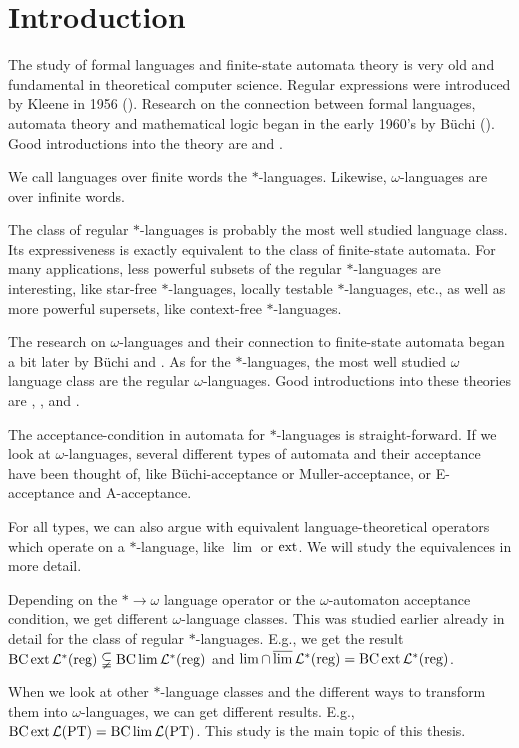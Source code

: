 
\section{Introduction}

The study of formal languages and finite-state automata theory is very old and fundamental in theoretical computer science. Regular expressions were introduced by Kleene in 1956 (\cite{Kleene56}). Research on the connection between formal languages, automata theory and mathematical logic began in the early 1960's by Büchi (\cite{Buchi60}). Good introductions into the theory are \cite{FinAutLogR109} and \cite{LangAutLogicR102}.

We call languages over finite words the $*$-languages. Likewise, $\omega$-languages are over infinite words.

The class of regular $*$-languages is probably the most well studied language class. Its expressiveness is exactly equivalent to the class of finite-state automata. For many applications, less powerful subsets of the regular $*$-languages are interesting, like star-free $*$-languages, locally testable $*$-languages, etc., as well as more powerful supersets, like context-free $*$-languages.

The research on $\omega$-languages and their connection to finite-state automata began a bit later by Büchi \cite{DecisionSOR111} and \cite{Muller63}. As for the $*$-languages, the most well studied $\omega$ language class are the regular $\omega$-languages. Good introductions into these theories are \cite{AutInfObjsR103}, \cite{InfCompR101}, \cite{OmLangR108} and \cite{InfWordsR110}.

The acceptance-condition in automata for $*$-languages is straight-forward. If we look at $\omega$-languages, several different types of automata and their acceptance have been thought of, like Büchi-acceptance or Muller-acceptance, or E-acceptance and A-acceptance.

For all types, we can also argue with equivalent language-theoretical operators which operate on a $*$-language, like $\lim$ or $\operatorname{ext}$. We will study the equivalences in more detail.

Depending on the $* \rightarrow \omega$ language operator or the $\omega$-automaton acceptance condition, we get different $\omega$-language classes. This was studied earlier already in detail for the class of regular $*$-languages. E.g., we get the result $\operatorname{BC} \operatorname{ext} \mathcal{L}^*(\text{reg}) \subsetneqq \operatorname{BC} \lim \mathcal{L}^*(\text{reg})$ and $\lim \cap \operatorname{\overline{lim}} \mathcal{L}^*(\text{reg}) = \operatorname{BC} \operatorname{ext} \mathcal{L}^*(\text{reg})$.

When we look at other $*$-language classes and the different ways to transform them into $\omega$-languages, we can get different results. E.g., $\operatorname{BC} \operatorname{ext} \mathcal{L}(\textup{\textrm{PT}}) = \operatorname{BC} \lim \mathcal{L}(\textup{\textrm{PT}})$. This study is the main topic of this thesis.
